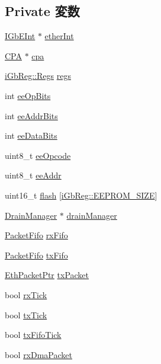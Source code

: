 \subsection*{Private 変数}
\begin{DoxyCompactItemize}
\item 
\hyperlink{classIGbEInt}{IGbEInt} $\ast$ \hyperlink{classIGbE_a4c7684471cc2bc72bc660ea06ca78c91}{etherInt}
\item 
\hyperlink{classCPA}{CPA} $\ast$ \hyperlink{classIGbE_ad3738d2e08f4ea21f1c3721f2492c9c2}{cpa}
\item 
\hyperlink{structiGbReg_1_1Regs}{iGbReg::Regs} \hyperlink{classIGbE_aca82e9e23b43d692ee2d79799761533f}{regs}
\item 
int \hyperlink{classIGbE_a8988636da8c2e4f74e8c62d7ad585a61}{eeOpBits}
\item 
int \hyperlink{classIGbE_a976342e4e142f8f031f86a8e7ce7a55f}{eeAddrBits}
\item 
int \hyperlink{classIGbE_ad2c36d4fa51a4befaa7518f6fa3590be}{eeDataBits}
\item 
uint8\_\-t \hyperlink{classIGbE_aa6c5c24d6b03e9f01ddacc4448214383}{eeOpcode}
\item 
uint8\_\-t \hyperlink{classIGbE_a00d8c4d0c00b1a7fc2a5885222511eee}{eeAddr}
\item 
uint16\_\-t \hyperlink{classIGbE_a7a8d29882b2cc202e8f3d9f4e758937c}{flash} \mbox{[}\hyperlink{namespaceiGbReg_adb0e1024d46141c966014951f5b1e5c8}{iGbReg::EEPROM\_\-SIZE}\mbox{]}
\item 
\hyperlink{classDrainManager}{DrainManager} $\ast$ \hyperlink{classIGbE_a329b71fb934a93312ca0aacbf5a3f982}{drainManager}
\item 
\hyperlink{classPacketFifo}{PacketFifo} \hyperlink{classIGbE_a45c9c6a3665bcd91e57ff35aa9089fa7}{rxFifo}
\item 
\hyperlink{classPacketFifo}{PacketFifo} \hyperlink{classIGbE_ae699c324753236e0a59aa2465920eb46}{txFifo}
\item 
\hyperlink{classRefCountingPtr}{EthPacketPtr} \hyperlink{classIGbE_a8d22e1a154942ff0d4ab9048e7e844bb}{txPacket}
\item 
bool \hyperlink{classIGbE_a3dd1ff20ea750ba74f718ba7e7c210fe}{rxTick}
\item 
bool \hyperlink{classIGbE_a0f33aec9eb84199e089e1917f7df501d}{txTick}
\item 
bool \hyperlink{classIGbE_a99be71cc5dbbb45b77d1d66d1bedf454}{txFifoTick}
\item 
bool \hyperlink{classIGbE_aa8031223419e9d8480a99fae1f2de778}{rxDmaPacket}

\end{DoxyCompactItemize}
